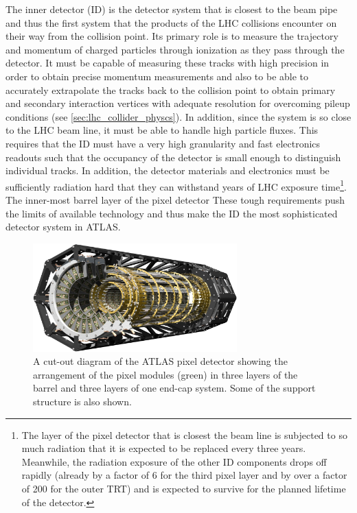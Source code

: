 The inner detector (ID) is the 
detector system that is closest to the beam pipe and thus the
first system that the products of the LHC collisions encounter
on their way from the collision point. Its primary role is 
to measure the trajectory and momentum of charged particles
through ionization as they pass through the detector.
It must be capable of measuring these tracks with high precision
in order to obtain precise momentum measurements and also to be able
to accurately extrapolate the tracks back to the collision point
to obtain primary and secondary interaction vertices with adequate
resolution for overcoming pileup 
conditions (see \sec\ref{sec:lhc_collider_physcs}). In addition,
since the system is so close to the LHC beam line, it
must be able to handle high particle fluxes. This requires that
the ID must have a very high granularity and fast electronics
readouts such that the occupancy of the
detector is small enough to distinguish individual tracks. In addition,
the detector materials and electronics must be sufficiently radiation
hard that they can withstand years of LHC 
exposure time\footnote{The layer of the pixel detector that is closest
the beam line is subjected to so much radiation that it is expected to be replaced
every three years.  Meanwhile, the radiation exposure of the other ID
components drops off rapidly (already by a factor of 6 for the third
pixel layer and by over a factor of 200 for the outer TRT) and is 
expected to survive for the planned lifetime of the detector.}.
The inner-most barrel layer of the pixel detector 
These tough requirements push the limits of available technology and thus
make the ID the most sophisticated detector system in ATLAS.



\begin{figure}[ht!]
\centering
\includegraphics[width=0.7\textwidth]{figures/atlas/pixel.eps}
\caption{A cut-out diagram of the ATLAS pixel detector showing 
the arrangement of the pixel modules (green) in three layers of the barrel
and three layers of one end-cap system. Some of the support structure is
also shown.}
\label{fig:atlas_pixel}
\end{figure}

